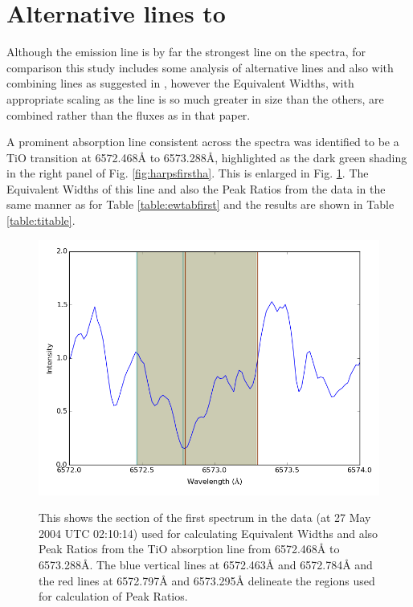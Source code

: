 \section{Alternative lines to {\ha}}
\protect\label{section:alternativelines}

Although the {\ha} emission line is by far the strongest line on the {\prox} spectra, for comparison this study includes
some analysis of alternative lines and also with combining lines as suggested in \citet{hall99}, however the Equivalent
Widths, with appropriate scaling as the {\ha} line is so much greater in size than the others, are combined rather than
the fluxes as in that paper.

A prominent absorption line consistent across the spectra was identified to be a TiO transition at 6572.468{\AA} to
6573.288{\AA}, highlighted as the dark green shading in the right panel of Fig. \ref{fig:harpsfirstha}. This is enlarged
in Fig. \ref{fig:tispec}. The Equivalent Widths of this line and also the Peak Ratios from the {\harps} data in the same
manner as for Table \ref{table:ewtabfirst} and the results are shown in Table \ref{table:titable}.

\begin{figure}[!htbp]
\begin{center}
\includegraphics[scale=0.25]{Figures/tispec.png} \\
\end{center}   
\caption{This shows the section of the first spectrum in the {\harps} data (at 27 May 2004 UTC 02:10:14) used for
  calculating Equivalent Widths and also Peak Ratios from the TiO absorption line from 6572.468{\AA} to
  6573.288{\AA}. The blue vertical lines at 6572.463{\AA} and 6572.784{\AA} and the red lines at 6572.797{\AA} and
  6573.295{\AA} delineate the regions used for calculation of Peak Ratios.}
\protect\label{fig:tispec}
\end{figure}


